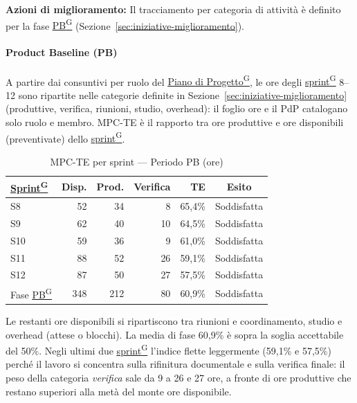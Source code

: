 \documentclass[a4paper,12pt]{article}
\providecommand{\glslink}[2]{\href{https://alittlebyte-19.github.io/Documentazione/glossario.html\#gls-#1}{\underline{#2}\textsuperscript{\scriptsize G}}}
\begin{document}
\noindent\textbf{Azioni di miglioramento:} Il tracciamento per categoria di attività è definito per la fase \glslink{pb-product-baseline}{PB} (Sezione~\ref{sec:iniziative-miglioramento}).

\paragraph*{Product Baseline (PB)} A partire dai consuntivi per ruolo del \glslink{piano-di-progetto}{Piano di Progetto}, le ore degli \glslink{sprint}{sprint} 8--12 sono ripartite nelle categorie definite in Sezione~\ref{sec:iniziative-miglioramento} (produttive, verifica, riunioni, studio, overhead): il foglio ore e il PdP catalogano solo ruolo e membro. MPC-TE è il rapporto tra ore produttive e ore disponibili (preventivate) dello \glslink{sprint}{sprint}.

\begin{table}[H]
\centering
{}
\begin{tabular}{|l|r|r|r|r|c|}
    \hline
    \rowcolor{gray!35}
    \textbf{\glslink{sprint}{Sprint}} & \textbf{Disp.} & \textbf{Prod.} & \textbf{Verifica} & \textbf{TE} & \textbf{Esito} \\
    \hline
    S8 & 52 & 34 & 8 & 65,4\% & \textcolor{green!60!black}{Soddisfatta} \\
    S9 & 62 & 40 & 10 & 64,5\% & \textcolor{green!60!black}{Soddisfatta} \\
    S10 & 59 & 36 & 9 & 61,0\% & \textcolor{green!60!black}{Soddisfatta} \\
    S11 & 88 & 52 & 26 & 59,1\% & \textcolor{green!60!black}{Soddisfatta} \\
    S12 & 87 & 50 & 27 & 57,5\% & \textcolor{green!60!black}{Soddisfatta} \\
    \hline
    Fase \glslink{pb-product-baseline}{PB} & 348 & 212 & 80 & 60,9\% & \textcolor{green!60!black}{Soddisfatta} \\
    \hline
\end{tabular}
\caption{MPC-TE per sprint — Periodo PB (ore)}
\end{table}

Le restanti ore disponibili si ripartiscono tra riunioni e coordinamento, studio e overhead (attese o blocchi). La media di fase 60,9\% è sopra la soglia accettabile del 50\%. Negli ultimi due \glslink{sprint}{sprint} l'indice flette leggermente (59,1\% e 57,5\%) perché il lavoro si concentra sulla rifinitura documentale e sulla verifica finale: il peso della categoria \textit{verifica} sale da 9 a 26 e 27 ore, a fronte di ore produttive che restano superiori alla metà del monte ore disponibile.
\end{document}
